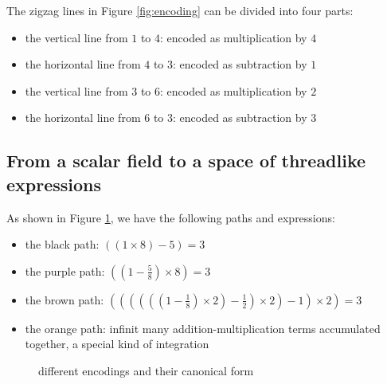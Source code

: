 The zigzag lines in Figure \ref{fig:encoding} can be divided into four parts:
\begin{itemize}
\item the vertical line from $1$ to $4$: encoded as multiplication by $4$
\item the horizontal line from $4$ to $3$: encoded as subtraction by $1$
\item the vertical line from $3$ to $6$: encoded as multiplication by $2$
\item the horizontal line from $6$ to $3$: encoded as subtraction by $3$
\end{itemize}

\subsection{From a scalar field to a space of threadlike expressions}

As shown in Figure \ref{fig:canonicalform}, we have the following paths and expressions:
\begin{itemize}
\item the black path: $((1 \times 8) - 5) = 3$
\item the purple path: $((1 - \frac{5}{8}) \times 8) = 3$
\item the brown path: $((((((1 - \frac{1}{8}) \times 2) - \frac{1}{2}) \times 2) - 1) \times 2) = 3$
\item the orange path: infinit many addition-multiplication terms accumulated together, a special kind of integration
\end{itemize}

\begin{figure}[ht]
\centering
{}
\caption{different encodings and their canonical form}\label{fig:canonicalform}
\end{figure}


